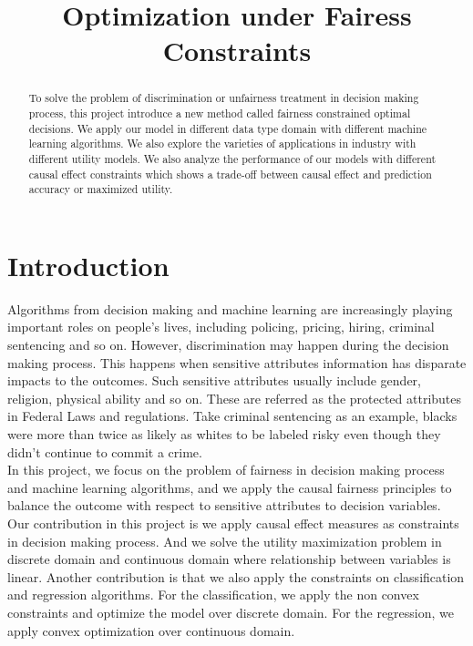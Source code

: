 \documentclass{article} %
\title{Optimization under Fairess Constraints}
\author{}
\begin{document}
\maketitle

\begin{abstract}
To solve the problem of discrimination or unfairness treatment in decision making process, this project introduce a new method called fairness constrained optimal decisions. We apply our model in different data type domain with different machine learning algorithms. We also explore the varieties of applications in industry with different utility models. We also analyze the performance of our models with different causal effect constraints which shows a trade-off between causal effect and prediction accuracy or maximized utility.
\end{abstract}
\section{Introduction}
\hspace*{1em}Algorithms from decision making and machine learning are increasingly playing important roles on people's lives, including policing, pricing, hiring, criminal sentencing and so on. However, discrimination may happen during the decision making process. This happens when sensitive attributes information has disparate impacts to the outcomes. Such sensitive attributes usually include gender, religion, physical ability and so on. These are referred as the protected attributes in Federal Laws and regulations. Take criminal sentencing as an example, blacks were more than twice as likely as whites to be labeled risky even though they didn't continue to commit a crime.\\
\hspace*{1em}In this project, we focus on the problem of fairness in decision making process and machine learning algorithms, and we apply the causal fairness principles to balance the outcome with respect to sensitive attributes to decision variables.\\
\hspace*{1em}Our contribution in this project is we apply causal effect measures as constraints in decision making process. And we solve the utility maximization problem in discrete domain and continuous domain where relationship between variables is linear. Another contribution is that we also apply the constraints on classification and regression algorithms. For the classification, we apply the non convex constraints and optimize the model over discrete domain. For the regression, we apply convex optimization over continuous domain.\\
\end{document}
